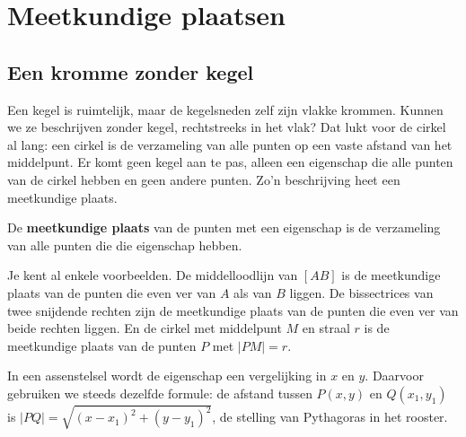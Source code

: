\begin{oefeningen}
\end{oefeningen}

\section{Meetkundige plaatsen}

\subsection{Een kromme zonder kegel}

Een kegel is ruimtelijk, maar de kegelsneden zelf zijn vlakke krommen. Kunnen we ze beschrijven zonder kegel, rechtstreeks in het vlak? Dat lukt voor de cirkel al lang: een cirkel is de verzameling van alle punten op een vaste afstand van het middelpunt. Er komt geen kegel aan te pas, alleen een eigenschap die alle punten van de cirkel hebben en geen andere punten. Zo'n beschrijving heet een meetkundige plaats.

\begin{theorie}
De \textbf{\textcolor{accent}{meetkundige plaats}} van de punten met een eigenschap is de verzameling van alle punten die die eigenschap hebben.
\end{theorie}

Je kent al enkele voorbeelden. De middelloodlijn van $[AB]$ is de meetkundige plaats van de punten die even ver van $A$ als van $B$ liggen. De bissectrices van twee snijdende rechten zijn de meetkundige plaats van de punten die even ver van beide rechten liggen. En de cirkel met middelpunt $M$ en straal $r$ is de meetkundige plaats van de punten $P$ met $|PM| = r$.

In een assenstelsel wordt de eigenschap een vergelijking in $x$ en $y$. Daarvoor gebruiken we steeds dezelfde formule: de afstand tussen $P(x, y)$ en $Q(x_1, y_1)$ is $|PQ| = \sqrt{(x - x_1)^2 + (y - y_1)^2}$, de stelling van Pythagoras in het rooster.

